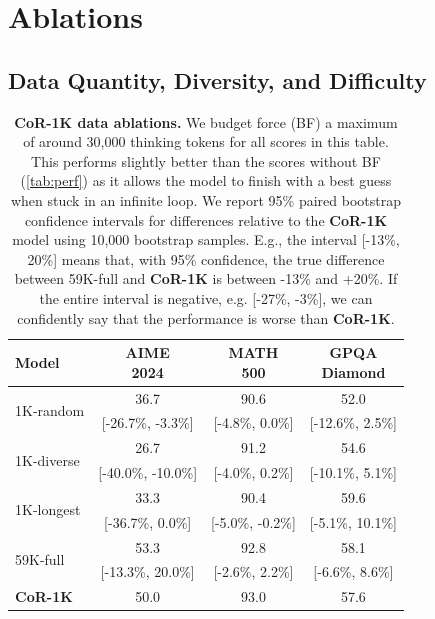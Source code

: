 \documentclass{article}
\theoremstyle{plain}
\theoremstyle{definition}
\theoremstyle{remark}
\newcommand{\data}{\textbf{CoR-1K}}
\begin{document}
\section{Ablations}
\label{sec:abl}

\subsection{Data Quantity, Diversity, and Difficulty}
\label{sec:dataabl}

\begin{table}[htbp]
\caption{\textbf{\data{} data ablations.} We budget force (BF) a maximum of around 30,000 thinking tokens for all scores in this table. This performs slightly better than the scores without BF (\autoref{tab:perf}) as it allows the model to finish with a best guess when stuck in an infinite loop. We report 95\%  paired bootstrap confidence intervals for differences relative to the \data{} model using 10,000 bootstrap samples. E.g., the interval [-13\%, 20\%] means that, with 95\% confidence, the true difference between 59K-full and \data{} is between -13\% and +20\%. If the entire interval is negative, e.g. [-27\%, -3\%], we can confidently say that the performance is worse than \data{}.}
\begin{tabular}{l|ccc}
\toprule 
Model & \makecell{AIME\\2024} & \makecell{MATH\\500} & \makecell{GPQA\\Diamond} \\ 
\midrule
\multirow{2}{*}{1K-random} & 36.7 & 90.6 & 52.0 \\
& \scriptsize{[-26.7\%, -3.3\%]} & \scriptsize{[-4.8\%, 0.0\%]} & \scriptsize{[-12.6\%, 2.5\%]} \\
\multirow{2}{*}{1K-diverse} & 26.7 & 91.2 & 54.6 \\
& \scriptsize{[-40.0\%, -10.0\%]} & \scriptsize{[-4.0\%, 0.2\%]} &  \scriptsize{[-10.1\%, 5.1\%]}\\
\multirow{2}{*}{1K-longest} & 33.3 & 90.4 & 59.6 \\
& \scriptsize{[-36.7\%, 0.0\%]} & \scriptsize{[-5.0\%, -0.2\%]} & \scriptsize{[-5.1\%, 10.1\%]} \\
\multirow{2}{*}{59K-full} & 53.3 & 92.8 & 58.1 \\
& \scriptsize{[-13.3\%, 20.0\%]} & \scriptsize{[-2.6\%, 2.2\%]} & \scriptsize{[-6.6\%, 8.6\%]} \\
\midrule
\data{} & 50.0 & 93.0 & 57.6 \\
\bottomrule
\end{tabular}
\label{tab:datablation}
\end{table}
\end{document}
